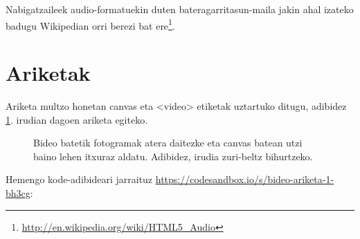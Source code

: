 Nabigatzaileek audio-formatuekin duten bateragarritasun-maila jakin ahal izateko badugu Wikipedian orri berezi bat ere\footnote{\href{http://en.wikipedia.org/wiki/HTML5\_Audio}{http://en.wikipedia.org/wiki/HTML5\_Audio}}.

\section{Ariketak}

Ariketa multzo honetan canvas eta <video> etiketak uztartuko ditugu, adibidez \ref{fig:bideoariketa}. irudian dagoen ariketa egiteko. 

\begin{figure}[ht]
	\centering
{}
\caption{Bideo batetik fotogramak atera daitezke eta canvas batean utzi baino lehen itxuraz aldatu. Adibidez, irudia zuri-beltz bihurtzeko.}
\label{fig:bideoariketa}
\end{figure}

Hemengo kode-adibideari jarraituz
\href{https://codesandbox.io/s/bideo-ariketa-1-bh3cg}{https://codesandbox.io/s/bideo-ariketa-1-bh3cg}:


